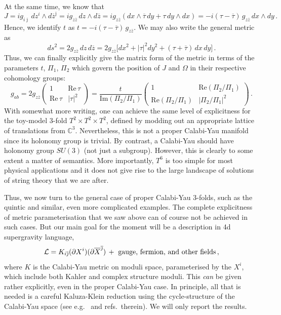 \documentclass[12pt]{article}
\newcommand{\be}{\begin{equation}}
\newcommand{\ee}{\end{equation}}
\newcommand{\ol}{\overline}
\numberwithin{equation}{section}
\begin{document}
At the same time, we know that 
\be
J=ig_{i\ol{\jmath}}\,dz^i\wedge d\ol{z}^{\ol{\jmath}}=ig_{z\ol{z}}\,dz\wedge 
d\ol{z}=ig_{z\ol{z}}(dx\wedge\ol{\tau}\,dy+\tau\,dy\wedge dx)
=-i(\tau-\ol{\tau})\,g_{z\ol{z}}\,dx\wedge dy\,.
\ee
Hence, we identify $t$ as $t=-i(\tau-\ol{\tau})\,g_{z\ol{z}}$. We may also write the general metric as
\be
ds^2=2g_{z\ol{z}}\,dz\,d\ol{z}=2g_{z\ol{z}} \big[dx^2+|\tau|^2dy^2+(\tau+\ol{\tau})\,dx\,dy\big]\,.
\ee
Thus, we can finally explicitly give the matrix form of the metric in terms of the parameters $t$, $\Pi_1$, $\Pi_2$ which govern the position of $J$ and $\Omega$ in their respective cohomology groups:
\be
g_{ab}=2g_{z\ol{z}}\left(\begin{array}{cc} 1 & \mbox{Re}\,\tau \\ \mbox{Re}\,\tau & |\tau|^2 \end{array}\right) = \frac{t}{\mbox{Im}(\Pi_2/\Pi_1)} \left(\begin{array}{cc} 1 & \mbox{Re}(\Pi_2/\Pi_1) \\ \mbox{Re}(\Pi_2/\Pi_1) & |\Pi_2/\Pi_1|^2 \end{array}\right)\,.
\ee
With somewhat more writing, one can achieve the same level of explicitness for the toy-model 3-fold $T^2\times T^2\times T^2$, defined by modding out an appropriate lattice of translations from $\mathbb{C}^3$. Nevertheless, this is not a proper Calabi-Yau manifold since its holonomy group is trivial. By contrast, a Calabi-Yau should have holonomy group $SU(3)$ (not just a subgroup). However, this is clearly to some extent a matter of semantics. More importantly, $T^6$ is too simple for most physical applications and it does not give rise to the large landscape of solutions of string theory that we are after.

Thus, we now turn to the general case of proper Calabi-Yau 3-folds, such as the quintic and similar, even more complicated examples. The complete explicitness of metric parameterisation that we saw above can of course not be achieved in such cases. But our main goal for the moment will be a description in 4d supergravity language,
\be
{\cal L}=K_{i\ol{\jmath}}(\partial X^i)(\partial \ol{X}^{\ol{\jmath}})\,+\,\,\mbox{gauge, fermion, and other fields}\,,
\ee
where $K$ is the Calabi-Yau metric on moduli space, parameterised by the $X^i$, which include both Kahler and complex structure moduli. This {\it can} be given rather explicitly, even in the proper Calabi-Yau case. In principle, all that is needed is a careful Kaluza-Klein reduction using the cycle-structure of the Calabi-Yau space (see e.g.~\cite{Grimm:2004uq, Jockers:2004yj, Grimm:2004ua, Kerstan:2011dy} and refs.~therein). We will only report the results.
\end{document}
